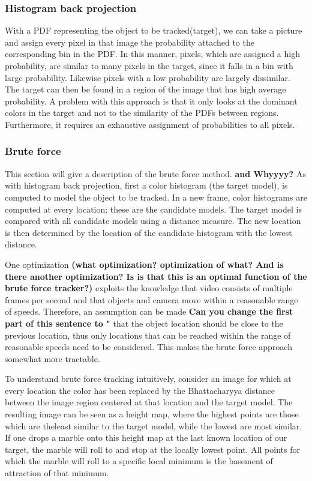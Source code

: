 \documentclass[a4paper,11pt]{article}
\begin{document}
\subsubsection{Histogram back projection}

With a PDF representing the object to be tracked(target), we can take a picture and assign every pixel in that image the probability attached to the corresponding bin in the PDF. In this manner, pixels, which are assigned a high probability, are similar to many pixels in the target, since it falls in a bin with large probability. Likewise pixels with a low probability are largely dissimilar. The target can then be found in a region of the image that has high average probability. A problem with this approach is that it only looks at the dominant colors in the target and not to the similarity of the PDFs between regions. Furthermore, it requires an exhaustive assignment of probabilities to all pixels.


\subsubsection{Brute force}
This section will give a description of the brute force method. \textbf{and Whyyyy?} As with histogram back projection, first a color histogram (the target model), is computed to model the object to be tracked. In a new frame, color histograms are computed at every location; these are the candidate models. The target model is compared with all candidate models using a distance measure. The new location is then determined by the location of the candidate histogram with the lowest distance.

One optimization \textbf{(what optimization? optimization of what? And is there another optimization? Is is that this is an optimal function of the brute force tracker?)} exploits the knowledge that video consists of multiple frames per second and that objects and camera move within a reasonable range of speeds. Therefore, an assumption can be made \textbf{Can you change the first part of this sentence to "} that the object location should be close to the previous location, thus only locations that can be reached within the range of reasonable speeds need to be considered. This makes the brute force approach somewhat more tractable. 

To understand brute force tracking intuitively, consider an image for which at every location the color has been replaced by the Bhattacharyya distance between the image region centered at that location and the target model. The resulting image can be seen as a height map, where the highest points are those which are theleast similar to the target model, while the lowest are most similar. If one drops a marble onto this height map at the last known location of our target, the marble will roll to and stop at the locally lowest point. All points for which the marble will roll to a specific local minimum is the basement of attraction of that minimum. 
\end{document}
